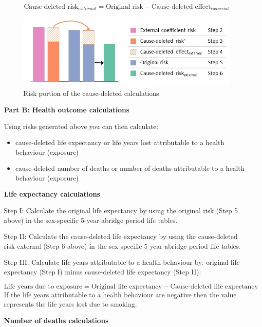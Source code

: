 \documentclass[]{book}
\providecommand{\tightlist}{%
  \setlength{\itemsep}{0pt}\setlength{\parskip}{0pt}}
\begin{document}
\[\text{Cause-deleted risk}_{ external} = \text{Original risk} - \text{Cause-deleted effect}_{external}\]

\begin{figure}

{\centering \includegraphics{Method2 only -cbf} 

}

\caption{Risk portion of the cause-deleted calculations}\label{fig:unnamed-chunk-11}
\end{figure}

\textbf{Part B: Health outcome calculations}

Using risks generated above you can then calculate:

\begin{itemize}
\tightlist
\item
  cause-deleted life expectancy or life years lost attributable to a
  health behaviour (exposure)
\item
  cause-deleted number of deaths or number of deaths attributable to a
  health behaviour (exposure)
\end{itemize}

\textbf{Life expectancy calculations}

Step I: Calculate the original life expectancy by using the original
risk (Step 5 above) in the sex-specific 5-year abridge period life
tables.

Step II: Calculate the cause-deleted life expectancy by using the
cause-deleted risk external (Step 6 above) in the sex-specific 5-year
abridge period life tables.

Step III: Calculate life years attributable to a health behaviour by:
original life expectancy (Step I) minus cause-deleted life expectancy
(Step II):

\[ \text{Life years due to exposure} = \text{Original life expectancy} - \text{Cause-deleted life expectancy}\]
If the life years attributable to a health behaviour are negative then
the value represents the life years lost due to smoking.

\textbf{Number of deaths calculations}
\end{document}
